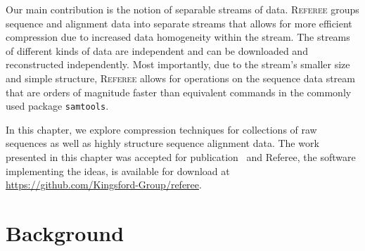 \documentclass[12pt]{cmuthesis}
\newcommand{\refer}{\textsc{Referee}\xspace}
\begin{document}
Our main contribution is the notion of separable streams of data. \refer groups sequence and alignment data into separate streams that allows for more efficient compression due to increased data homogeneity within the stream. The streams of different kinds of data are independent and can be downloaded and reconstructed independently. Most importantly, due to the stream's smaller size and simple structure, \refer allows for operations on the sequence data stream that are orders of magnitude faster than equivalent commands in the commonly used package \texttt{samtools}.


In this chapter, we explore compression techniques for collections of raw sequences as well as highly structure sequence alignment data. The work presented in this chapter was accepted for publication~\cite{Referee_draft} and Referee, the software implementing the ideas, is available for download at \url{https://github.com/Kingsford-Group/referee}.



\section{Background}


\end{document}
